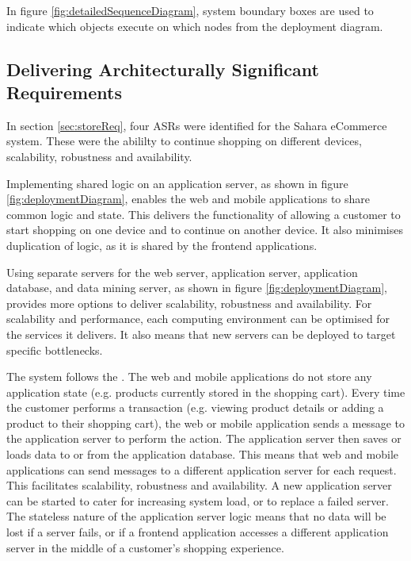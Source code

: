 In figure \ref{fig:detailedSequenceDiagram}, system boundary boxes are used to indicate which objects execute on which nodes from the deployment diagram.

\subsection{Delivering Architecturally Significant Requirements}
In section \ref{sec:storeReq}, four ASRs were identified for the Sahara eCommerce system.
These were the abililty to continue shopping on different devices, scalability, robustness and availability.

Implementing shared logic on an application server, as shown in figure \ref{fig:deploymentDiagram},
enables the web and mobile applications to share common logic and state.
This delivers the functionality of allowing a customer to start shopping on one device and to continue on another device.
It also minimises duplication of logic, as it is shared by the frontend applications.

Using separate servers for the web server, application server, application database, and data mining server,
as shown in figure \ref{fig:deploymentDiagram}, provides more options to deliver scalability, robustness and availability.
For scalability and performance, each computing environment can be optimised for the services it delivers.
It also means that new servers can be deployed to target specific bottlenecks.

The system follows the .
The web and mobile applications do not store any application state (e.g. products currently stored in the shopping cart).
Every time the customer performs a transaction (e.g. viewing product details or adding a product to their shopping cart),
the web or mobile application sends a message to the application server to perform the action.
The application server then saves or loads data to or from the application database.
This means that web and mobile applications can send messages to a different application server for each request.
This facilitates scalability, robustness and availability.
A new application server can be started to cater for increasing system load, or to replace a failed server.
The stateless nature of the application server logic means that no data will be lost if a server fails,
or if a frontend application accesses a different application server in the middle of a customer's shopping experience.

